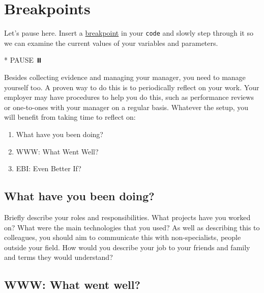 \documentclass[
]{book}
\newenvironment{Shaded}{\begin{snugshade}}{\end{snugshade}}
\newcommand{\NormalTok}[1]{#1}
\newcommand{\SpecialStringTok}[1]{\textcolor[rgb]{0.31,0.60,0.02}{#1}}
\providecommand{\tightlist}{%
  \setlength{\itemsep}{0pt}\setlength{\parskip}{0pt}}
\begin{document}
\hypertarget{visits}{%
\section{Breakpoints}\label{visits}}

Let's pause here. Insert a \href{https://en.wikipedia.org/wiki/Breakpoint}{breakpoint} in your \texttt{code} and slowly step through it so we can examine the current values of your variables and parameters.

\begin{Shaded}
\begin{Highlighting}[]
\SpecialStringTok{* }\NormalTok{PAUSE ⏸️}
\end{Highlighting}
\end{Shaded}

Besides collecting evidence and managing your manager, you need to manage yourself too. A proven way to do this is to periodically reflect on your work. Your employer may have procedures to help you do this, such as performance reviews or one-to-ones with your manager on a regular basis. Whatever the setup, you will benefit from taking time to reflect on:

\begin{enumerate}
\def\labelenumi{\arabic{enumi}.}
\tightlist
\item
  What have you been doing?
\item
  WWW: What Went Well?
\item
  EBI: Even Better If?
\end{enumerate}

\hypertarget{what-have-you-been-doing}{%
\subsection{What have you been doing?}\label{what-have-you-been-doing}}

Briefly describe your roles and responsibilities. What projects have you worked on? What were the main technologies that you used? As well as describing this to colleagues, you should aim to communicate this with non-specialists, people outside your field. How would you describe your job to your friends and family and terms they would understand?

\hypertarget{www-what-went-well}{%
\subsection{WWW: What went well?}\label{www-what-went-well}}
\end{document}
